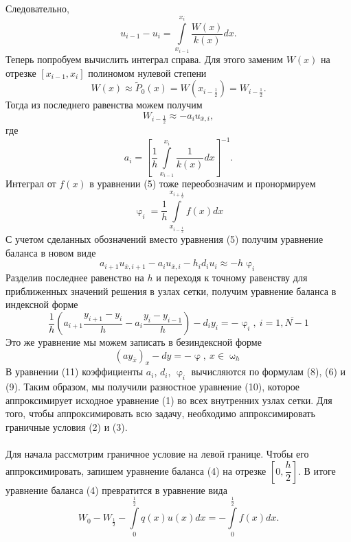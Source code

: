 \documentclass[a4paper, 12pt]{report}
\numberwithin{equation}{section}
\newcommand{\ol}{\overline}
\renewcommand{\varphi}{\upvarphi}
\renewcommand{\omega}{\upomega}
\begin{document}
		Следовательно,
		$$u_{i-1}-u_i = \int\limits_{x_{i-1}}^{x_i} \dfrac{W(x)}{k(x)}dx.$$
		Теперь попробуем вычислить интеграл справа. Для этого заменим $W(x)$ на отрезке $[x_{i-1}, x_i]$ полиномом нулевой степени
		$$W(x) \approx \widetilde P_0(x) = W(x_{i-\frac12}) = W_{i-\frac12}.$$
		Тогда из последнего равенства можем получим
		\begin{equation}
			W_{i-\frac12} \approx -a_i u_{\ol x, i},
		\end{equation}
		где \begin{equation}
			a_i = \left[ \dfrac 1h \int\limits_{x_{i-1}}^{x_i} \dfrac{1}{k(x)}dx\right]^{-1}.
		\end{equation}
		Интеграл от $f(x)$ в уравнении (5) тоже переобозначим и пронормируем
		\begin{equation}
			\varphi_i = \dfrac{1}{h} \int\limits_{x_{i-\frac12}}^{x_{i+\frac12}}f(x)dx
		\end{equation}
		С учетом сделанных обозначений вместо уравнения (5) получим уравнение баланса в новом виде
		$$a_{i+1}u_{\overline x, i+1} - a_i u_{\ol x, i} - h_i d_i u_i\approx -h \varphi_i$$
		Разделив последнее равенство на $h$ и переходя к точному равенству для приближенных значений решения в узлах сетки, получим уравнение баланса в индексной форме
		\begin{equation}
			\dfrac{1}{h}\left(a_{i+1}\dfrac{y_{i+1} - y_i}{h} - a_i \dfrac{y_i - y_{i-1}}{h}\right)-d_iy_i = -\varphi_i,\ i=\overline {1,N-1}
		\end{equation}
		Это же уравнение мы можем записать в безиндексной форме
		\begin{equation}
			(a y_{\ol x})_x - dy = -\varphi,\ x \in \omega_h
		\end{equation}
		В уравнении (11) коэффициенты $a_i$, $d_i$, $\varphi_i$ вычисляются по формулам (8), (6) и (9). Таким образом, мы получили разностное уравнение (10), которое аппроксимирует исходное уравнение (1) во всех внутренних узлах сетки. Для того, чтобы аппроксимировать всю задачу, необходимо аппроксимировать граничные условия (2) и (3).\\\\
		Для начала рассмотрим граничное условие на левой границе. Чтобы его аппроксимировать, запишем уравнение баланса (4) на отрезке $\left[0, \dfrac h2 \right]$. В итоге уравнение баланса (4) превратится в уравнение вида
		\begin{equation}
			W_0 - W_{\frac12} -\int\limits_{0}^{\frac12} q(x)u(x)dx = -\int\limits_{0}^{\frac12} f(x) dx.
		\end{equation} 
\end{document}

